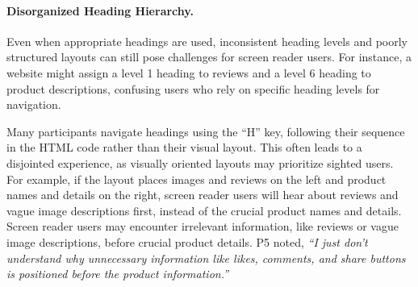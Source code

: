 \paragraph{\textbf{Disorganized Heading Hierarchy.}}
Even when appropriate headings are used, inconsistent heading levels and poorly structured layouts can still pose challenges for screen reader users. For instance, a website might assign a level 1 heading to reviews and a level 6 heading to product descriptions, confusing users who rely on specific heading levels for navigation.

Many participants navigate headings using the ``H'' key, following their sequence in the HTML code rather than their visual layout. This often leads to a disjointed experience, as visually oriented layouts may prioritize sighted users. For example, if the layout places images and reviews on the left and product names and details on the right, screen reader users will hear about reviews and vague image descriptions first, instead of the crucial product names and details. Screen reader users may encounter irrelevant information, like reviews or vague image descriptions, before crucial product details. P5 noted, \textit{``I just don’t understand why unnecessary information like likes, comments, and share buttons is positioned before the product information.''}



